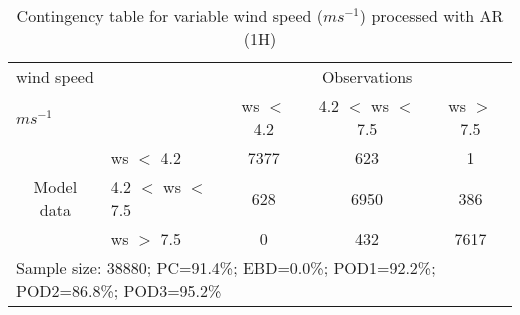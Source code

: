 \begin{table}[]
\begin{center}
\begin{tabular}{llccc}
\hline
{wind speed}                                       &                                                    & \multicolumn{3}{c}{Observations}                 \\
{$m s^{-1}$}                                       &                             & ws $<$ 4.2   & 4.2 $<$ ws $<$ 7.5 & ws $>$ 7.5 \\
\hline
\multicolumn{1}{c}{\multirow{3}{*}{Model data}}  & ws $<$ 4.2             & 7377                & 623                       & 1              \\
                                                 & 4.2  $<$ ws $<$ 7.5 & 628                & 6950                       & 386              \\
                                                 & ws $>$ 7.5             & 0                & 432                       & 7617              \\
\hline 
\multicolumn{5}{l}{Sample size: 38880; PC=91.4\%; EBD=0.0\%; POD1=92.2\%; POD2=86.8\%; POD3=95.2\%}                 \\
\end{tabular}
\end{center}
\caption{Contingency table for variable wind speed ($m s^{-1}$) processed with AR (1H)}
\label{tab:contingencywsAFT}
\end{table}
